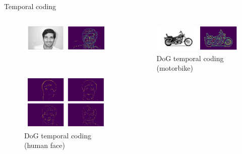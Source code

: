 \documentclass[10pt]{beamer}
\begin{document}
\begin{frame}{Temporal coding}

\begin{columns}
	\begin{figure}[!h]
		\centering
		\caption{DoG temporal coding (human face)}
		\begin{minipage}[b]{\textwidth}
			\includegraphics[width=\textwidth]{images/face_temp}
		\end{minipage}
		\\
		\begin{minipage}[b]{\textwidth}
			\includegraphics[width=\textwidth]{images/face_dog_out}
		\end{minipage}
	\end{figure}
	\begin{figure}[!h]
		\centering
		\caption{DoG temporal coding (motorbike)}
		\begin{minipage}[b]{\textwidth}
			\includegraphics[width=\textwidth]{images/motor_temp}

\end{minipage}
\end{figure}
\end{columns}
\end{frame}
\end{document}
